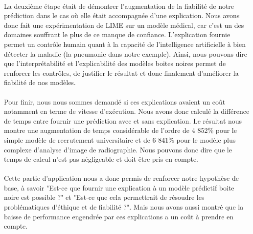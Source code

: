 \paragraph{}La deuxième étape était de démontrer l'augmentation de la fiabilité de notre prédiction dans le cas où elle était accompagnée d'une explication. Nous avons donc fait une expérimentation de LIME sur un modèle médical, car c'est un des domaines souffrant le plus de ce manque de confiance. L'explication fournie permet un contrôle humain quant à la capacité de l'intelligence artificielle à bien détecter la maladie (la pneumonie dans notre exemple). Ainsi, nous pouvons dire que l'interprétabilité et l'explicabilité des modèles boites noires permet de renforcer les contrôles, de justifier le résultat et donc finalement d'améliorer la fiabilité de nos modèles.

\paragraph{}Pour finir, nous nous sommes demandé si ces explications avaient un coût notamment en terme de vitesse d'exécution. Nous avons donc calculé la différence de temps entre fournir une prédiction avec et sans explication. Le résultat nous montre une augmentation de temps considérable de l'ordre de 4 852\% pour le simple modèle de recrutement universitaire et de 6 841\% pour le modèle plus complexe d'analyse d'image de radiographie. Nous pouvons donc dire que le temps de calcul n'est pas négligeable et doit 
être pris en compte.

\paragraph{}Cette partie d'application nous a donc permis de renforcer notre hypothèse de base, à savoir "Est-ce que fournir une explication à un modèle prédictif boite noire est possible ?" et "Est-ce que cela permettrait de résoudre les problématiques d'éthique et de fiabilité ?". Mais nous avons aussi montré que la baisse de performance engendrée par ces explications a un coût à prendre en compte.